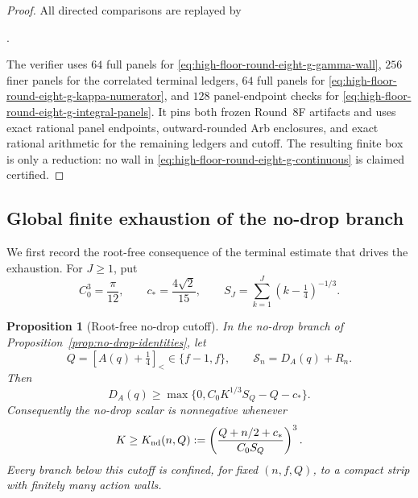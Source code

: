 \documentclass[11pt]{article}
\newtheorem{proposition}[theorem]{Proposition}
\theoremstyle{remark}
\newcommand{\sbr}[1]{[#1]_{<}}
\begin{document}
\begin{proof}
All directed comparisons are replayed by
\begin{center}
 \small{}.
\end{center}
The verifier uses $64$ full panels for
\eqref{eq:high-floor-round-eight-g-gamma-wall}, $256$ finer panels for
the correlated terminal ledgers, $64$ full panels for
\eqref{eq:high-floor-round-eight-g-kappa-numerator}, and $128$
panel-endpoint checks for
\eqref{eq:high-floor-round-eight-g-integral-panels}.  It pins both
frozen Round~8F artifacts and uses exact rational panel endpoints,
outward-rounded Arb enclosures, and exact rational arithmetic for the
remaining ledgers and cutoff.  The resulting finite box is only a
reduction: no wall in
\eqref{eq:high-floor-round-eight-g-continuous} is claimed certified.
\end{proof}

\subsection{Global finite exhaustion of the no-drop branch}

We first record the root-free consequence of the terminal estimate that
drives the exhaustion.  For $J\geq1$, put
\begin{equation}
 C_0^3=\frac\pi{12},\qquad c_*=\frac{4\sqrt2}{15},
 \qquad S_J=\sum_{k=1}^{J}(k-\tfrac14)^{-1/3}.
 \label{eq:no-drop-cutoff-constants}
\end{equation}

\begin{proposition}[Root-free no-drop cutoff]
\label{prop:root-free-no-drop-cutoff}
In the no-drop branch of Proposition~\ref{prop:no-drop-identities}, let
\[
 Q=\sbr{A(q)+\tfrac14}\in\{f-1,f\},\qquad
 \mathcal S_n=D_A(q)+R_n.
\]
Then
\begin{equation}
 D_A(q)\geq
 \max\{0,C_0K^{1/3}S_Q-Q-c_*\}.
 \label{eq:root-free-terminal-reserve}
\end{equation}
Consequently the no-drop scalar is nonnegative whenever
\begin{equation}
 K\geq K_{\rm nd}(n,Q):=
 \left(\frac{Q+n/2+c_*}{C_0S_Q}\right)^3.
 \label{eq:no-drop-cutoff}
\end{equation}
Every branch below this cutoff is confined, for fixed $(n,f,Q)$, to a
compact strip with finitely many action walls.
\end{proposition}
\end{document}
